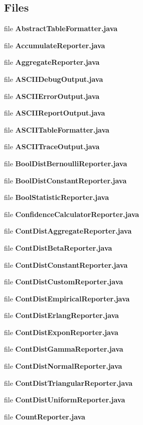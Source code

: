 \subsection*{Files}
\begin{DoxyCompactItemize}
\item 
file {\bfseries Abstract\-Table\-Formatter.\-java}
\item 
file {\bfseries Accumulate\-Reporter.\-java}
\item 
file {\bfseries Aggregate\-Reporter.\-java}
\item 
file {\bfseries A\-S\-C\-I\-I\-Debug\-Output.\-java}
\item 
file {\bfseries A\-S\-C\-I\-I\-Error\-Output.\-java}
\item 
file {\bfseries A\-S\-C\-I\-I\-Report\-Output.\-java}
\item 
file {\bfseries A\-S\-C\-I\-I\-Table\-Formatter.\-java}
\item 
file {\bfseries A\-S\-C\-I\-I\-Trace\-Output.\-java}
\item 
file {\bfseries Bool\-Dist\-Bernoulli\-Reporter.\-java}
\item 
file {\bfseries Bool\-Dist\-Constant\-Reporter.\-java}
\item 
file {\bfseries Bool\-Statistic\-Reporter.\-java}
\item 
file {\bfseries Confidence\-Calculator\-Reporter.\-java}
\item 
file {\bfseries Cont\-Dist\-Aggregate\-Reporter.\-java}
\item 
file {\bfseries Cont\-Dist\-Beta\-Reporter.\-java}
\item 
file {\bfseries Cont\-Dist\-Constant\-Reporter.\-java}
\item 
file {\bfseries Cont\-Dist\-Custom\-Reporter.\-java}
\item 
file {\bfseries Cont\-Dist\-Empirical\-Reporter.\-java}
\item 
file {\bfseries Cont\-Dist\-Erlang\-Reporter.\-java}
\item 
file {\bfseries Cont\-Dist\-Expon\-Reporter.\-java}
\item 
file {\bfseries Cont\-Dist\-Gamma\-Reporter.\-java}
\item 
file {\bfseries Cont\-Dist\-Normal\-Reporter.\-java}
\item 
file {\bfseries Cont\-Dist\-Triangular\-Reporter.\-java}
\item 
file {\bfseries Cont\-Dist\-Uniform\-Reporter.\-java}
\item 
file {\bfseries Count\-Reporter.\-java}

\end{DoxyCompactItemize}
